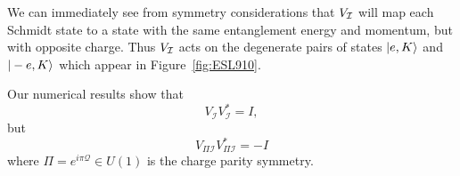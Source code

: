We can immediately see from symmetry considerations that $V_{\mathcal{I}}$ will map each Schmidt 
state to a state with the same entanglement energy and momentum, but with opposite charge.
Thus $V_{\mathcal{I}}$ acts on the degenerate pairs of states $\vert e, K \rangle$ and $\vert -e, K \rangle$ which
appear in Figure~\ref{fig:ESL910}. 

Our numerical results show that 
$$
V_{\mathcal{I}} V_{\mathcal{I}}^* = I, 
$$
but
$$
V_{\varPi \mathcal{I}} V_{\varPi \mathcal{I}}^* = -I 
$$
where $\varPi = e^{i \pi \mathcal{Q}} \in U(1)$ is the charge parity symmetry.








